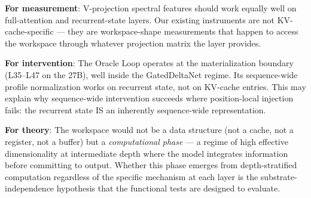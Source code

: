 \textbf{For measurement}: V-projection spectral features should work
equally well on full-attention and recurrent-state layers. Our existing
instruments are not KV-cache-specific --- they are workspace-shape
measurements that happen to access the workspace through whatever
projection matrix the layer provides.

\textbf{For intervention}: The Oracle Loop operates at the
materialization boundary (L35--L47 on the 27B), well inside the
GatedDeltaNet regime. Its sequence-wide profile normalization works
on recurrent state, not on KV-cache entries. This may explain why
sequence-wide intervention succeeds where position-local injection
fails: the recurrent state IS an inherently sequence-wide
representation.

\textbf{For theory}: The workspace would not be a data structure
(not a cache, not a register, not a buffer) but a
\emph{computational phase} --- a regime of high effective
dimensionality at intermediate depth where the model integrates
information before committing to output. Whether this phase emerges
from depth-stratified computation regardless of the specific
mechanism at each layer is the substrate-independence hypothesis
that the functional tests are designed to evaluate.
